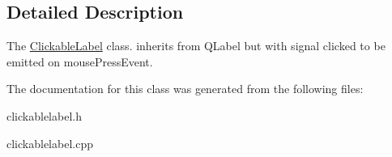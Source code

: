 \subsection{Detailed Description}
The \hyperlink{classClickableLabel}{Clickable\+Label} class. inherits from Q\+Label but with signal clicked to be emitted on mouse\+Press\+Event. 

The documentation for this class was generated from the following files\+:\begin{DoxyCompactItemize}
\item 
clickablelabel.\+h\item 
clickablelabel.\+cpp\end{DoxyCompactItemize}
